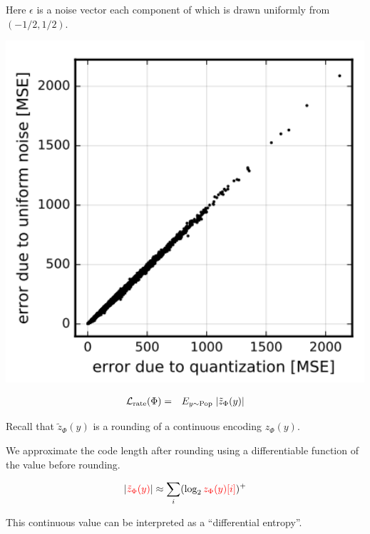 {\vfill
Here $\epsilon$ is a noise vector each component of which is drawn uniformly from $(-1/2,1/2)$.


\centerline{\includegraphics[height=5in]{../images/RateDist5}}



\begin{eqnarray*}
{\cal L}_{\mathrm{rate}}(\Phi) & = & E_{y \sim \mathrm{Pop}}\;|\tilde{z}_\Phi(y)| 
\end{eqnarray*}

\vfill
Recall that {\color{red} $\tilde{z}_\Phi(y)$} is a rounding of a continuous encoding {\color{red} $z_\Phi(y)$}.


\vfill
We approximate the code length after rounding using a differentiable function of the value before rounding.

\vfill
{\color{red} $$|{\color{red} \tilde{z}_\Phi(y)}| \approx \sum_i (\log_2 {\color{red} z_\Phi(y)[i]})^+$$}

This continuous value can be interpreted as a ``differential entropy''.


}
